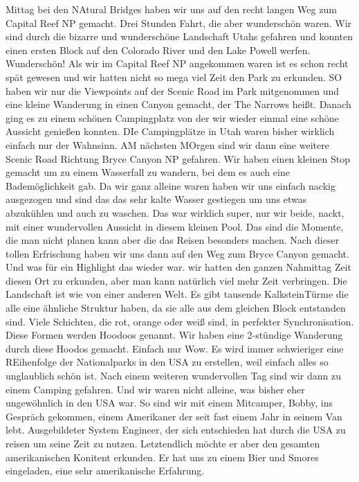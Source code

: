 \documentclass[11pt]{book}
\begin{document}
Mittag bei den NAtural Bridges haben wir uns auf den recht langen Weg zum Capital Reef NP gemacht. Drei Stunden Fahrt, die aber wunderschön waren. Wir sind durch die bizarre und 
wunderschöne Landschaft Utahs gefahren und konnten einen ersten Block auf den Colorado River und den Lake Powell werfen. Wunderschön! Als wir im Capital Reef NP 
angekommen waren ist es schon recht spät gewesen und wir hatten nicht so mega viel Zeit den Park zu erkunden. SO haben wir nur die Viewpoints auf der Scenic Road 
im Park mitgenommen und eine kleine Wanderung in einen Canyon gemacht, der The Narrows heißt. Danach ging es zu einem schönen Campingplatz von der wir wieder einmal eine schöne Aussicht genießen konnten. 
DIe Campingplätze in Utah waren bisher wirklich einfach nur der Wahnsinn. 
AM nächsten MOrgen sind wir dann eine weitere Scenic Road Richtung Bryce Canyon NP gefahren. Wir haben einen kleinen Stop gemacht um zu einem Wasserfall 
zu wandern, bei dem es auch eine Bademöglichkeit gab. Da wir ganz alleine waren haben wir uns einfach nackig ausgezogen und sind das das sehr kalte Wasser gestiegen um uns etwas abzukühlen 
und auch zu waschen. Das war wirklich super, nur wir beide, nackt, mit einer wundervollen Aussicht in diesem kleinen Pool. Das sind die Momente, die man nicht planen 
kann aber die das Reisen besonders machen. Nach dieser tollen Erfrischung haben wir uns dann auf den Weg zum Bryce Canyon gemacht. Und was für ein Highlight das wieder war. 
wir hatten den ganzen Nahmittag Zeit diesen Ort zu erkunden, aber man kann natürlich viel mehr Zeit verbringen. Die Landschaft ist wie von einer anderen Welt. Es gibt tausende KalksteinTürme
die alle eine ähnliche Struktur haben, da sie alle aus dem gleichen Block entstanden sind. Viele Schichten, die rot, orange oder weiß sind, in perfekter 
Synchronisation. Diese Formen werden Hoodoos genannt. Wir haben eine 2-stündige Wanderung durch diese Hoodos gemacht. Einfach nur Wow. Es wird immer schwieriger eine REihenfolge 
der Nationalparks in den USA zu erstellen, weil einfach alles so unglaublich schön ist. Nach einem weiteren wundervollen Tag sind wir dann zu einem Camping gefahren. Und wir waren nicht 
alleine, was bisher eher ungewöhnlich in den USA war. So sind wir mit einem Mitcamper, Bobby, ins Gespräch gekommen, einem Amerikaner der seit fast einem Jahr 
in seinem Van lebt. Ausgebildeter System Engineer, der sich entschieden hat durch die USA zu reisen um seine Zeit zu nutzen. Letztendlich möchte er aber den gesamten 
amerikanischen Konitent erkunden. Er hat uns zu einem Bier und Smores eingeladen, eine sehr amerikanische Erfahrung.
\end{document}

